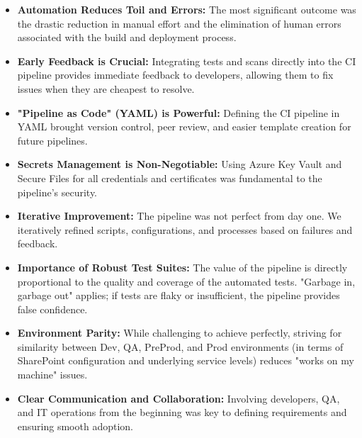 \begin{itemize}
    \item \textbf{Automation Reduces Toil and Errors:} The most significant outcome was the drastic reduction in manual effort and the elimination of human errors associated with the build and deployment process.
    \item \textbf{Early Feedback is Crucial:} Integrating tests and scans directly into the CI pipeline provides immediate feedback to developers, allowing them to fix issues when they are cheapest to resolve.
    \item \textbf{"Pipeline as Code" (YAML) is Powerful:} Defining the CI pipeline in YAML brought version control, peer review, and easier template creation for future pipelines.
    \item \textbf{Secrets Management is Non-Negotiable:} Using Azure Key Vault and Secure Files for all credentials and certificates was fundamental to the pipeline's security.
    \item \textbf{Iterative Improvement:} The pipeline was not perfect from day one. We iteratively refined scripts, configurations, and processes based on failures and feedback.
    \item \textbf{Importance of Robust Test Suites:} The value of the pipeline is directly proportional to the quality and coverage of the automated tests. "Garbage in, garbage out" applies; if tests are flaky or insufficient, the pipeline provides false confidence.
    \item \textbf{Environment Parity:} While challenging to achieve perfectly, striving for similarity between Dev, QA, PreProd, and Prod environments (in terms of SharePoint configuration and underlying service levels) reduces "works on my machine" issues.
    \item \textbf{Clear Communication and Collaboration:} Involving developers, QA, and IT operations from the beginning was key to defining requirements and ensuring smooth adoption.
\end{itemize}

